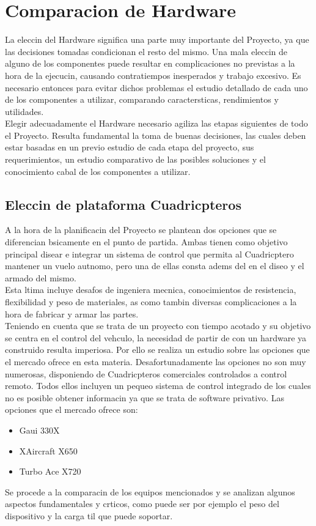 \documentclass[spanish,12pt,a4paper,titlepage]{report}
\begin{document}
\chapter{Comparacion de Hardware}


La eleccin del Hardware significa una parte muy importante del Proyecto, ya que las decisiones tomadas condicionan el resto del mismo. Una mala eleccin de alguno de los componentes puede resultar en complicaciones no previstas a la hora de la ejecucin, causando contratiempos inesperados y trabajo excesivo. Es necesario entonces para evitar dichos problemas el estudio detallado de cada uno de los componentes a utilizar, comparando caractersticas, rendimientos y utilidades. \\
Elegir adecuadamente el Hardware necesario agiliza las etapas siguientes de todo el Proyecto. Resulta fundamental la toma de buenas decisiones, las cuales deben estar basadas en un previo estudio de cada etapa del proyecto, sus requerimientos, un estudio comparativo de las posibles soluciones y el conocimiento cabal de los componentes a utilizar.\\

\section{Eleccin de plataforma Cuadricpteros}
\vspace*{15pt}

A la hora de la planificacin del Proyecto se plantean dos opciones que se diferencian bsicamente en el punto de partida. Ambas tienen como objetivo principal disear e integrar un sistema de control que permita al Cuadricptero mantener un vuelo autnomo, pero una de ellas consta adems del en  el diseo y el armado del mismo. \\Esta ltima incluye desafos de ingeniera mecnica, conocimientos de resistencia, flexibilidad y peso de materiales, as como tambin diversas complicaciones a la hora de fabricar y armar las partes. \\ Teniendo en cuenta que se trata de un proyecto con tiempo acotado y su objetivo se centra en el control del vehculo, la necesidad de partir de con un hardware ya construido resulta imperiosa. Por ello se realiza un estudio sobre las opciones que el mercado ofrece en esta materia. Desafortunadamente las opciones no son muy numerosas, disponiendo de Cuadricpteros comerciales controlados a control remoto. Todos ellos incluyen un pequeo sistema de control integrado de los cuales no es posible obtener informacin ya que se trata de software privativo. Las opciones que el mercado ofrece son: 
\begin{itemize}
	\item Gaui 330X
	\item XAircraft X650
	\item Turbo Ace X720
\end{itemize}
Se procede a la comparacin de los equipos mencionados y se analizan algunos aspectos fundamentales y crticos, como puede ser por ejemplo el peso del dispositivo y la carga til que puede soportar.
\end{document}
